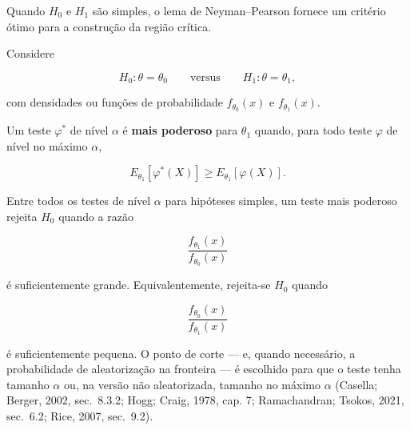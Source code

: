 \documentclass[
  letterpaper,
  DIV=11,
  numbers=noendperiod]{scrreprt}
\begin{document}
Quando \(H_0\) e \(H_1\) são simples, o lema de Neyman--Pearson fornece
um critério ótimo para a construção da região crítica.

Considere

\[H_0:\theta=\theta_0
\qquad\text{versus}\qquad
H_1:\theta=\theta_1,\]

com densidades ou funções de probabilidade \(f_{\theta_0}(x)\) e
\(f_{\theta_1}(x)\).

\begin{tcolorbox}[enhanced jigsaw, colback=white, leftrule=.75mm, colbacktitle=quarto-callout-note-color!10!white, breakable, titlerule=0mm, bottomtitle=1mm, title=\textcolor{quarto-callout-note-color}{\faInfo}\hspace{0.5em}{Definição: teste mais poderoso}, colframe=quarto-callout-note-color-frame, toprule=.15mm, opacityback=0, bottomrule=.15mm, opacitybacktitle=0.6, arc=.35mm, toptitle=1mm, rightrule=.15mm, coltitle=black, left=2mm]

Um teste \(\varphi^*\) de nível \(\alpha\) é \textbf{mais poderoso} para
\(\theta_1\) quando, para todo teste \(\varphi\) de nível no máximo
\(\alpha\),

\[E_{\theta_1}[\varphi^*(X)]
\geq
E_{\theta_1}[\varphi(X)].\]

\end{tcolorbox}

\begin{tcolorbox}[enhanced jigsaw, colback=white, leftrule=.75mm, colbacktitle=quarto-callout-tip-color!10!white, breakable, titlerule=0mm, bottomtitle=1mm, title=\textcolor{quarto-callout-tip-color}{\faLightbulb}\hspace{0.5em}{Teorema: lema de Neyman--Pearson}, colframe=quarto-callout-tip-color-frame, toprule=.15mm, opacityback=0, bottomrule=.15mm, opacitybacktitle=0.6, arc=.35mm, toptitle=1mm, rightrule=.15mm, coltitle=black, left=2mm]

Entre todos os testes de nível \(\alpha\) para hipóteses simples, um
teste mais poderoso rejeita \(H_0\) quando a razão

\[\frac{f_{\theta_1}(x)}{f_{\theta_0}(x)}\]

é suficientemente grande. Equivalentemente, rejeita-se \(H_0\) quando

\[\frac{f_{\theta_0}(x)}{f_{\theta_1}(x)}\]

é suficientemente pequena. O ponto de corte --- e, quando necessário, a
probabilidade de aleatorização na fronteira --- é escolhido para que o
teste tenha tamanho \(\alpha\) ou, na versão não aleatorizada, tamanho
no máximo \(\alpha\) (Casella; Berger, 2002, sec.~8.3.2; Hogg; Craig,
1978, cap. 7; Ramachandran; Tsokos, 2021, sec.~6.2; Rice, 2007,
sec.~9.2).

\end{tcolorbox}
\end{document}
